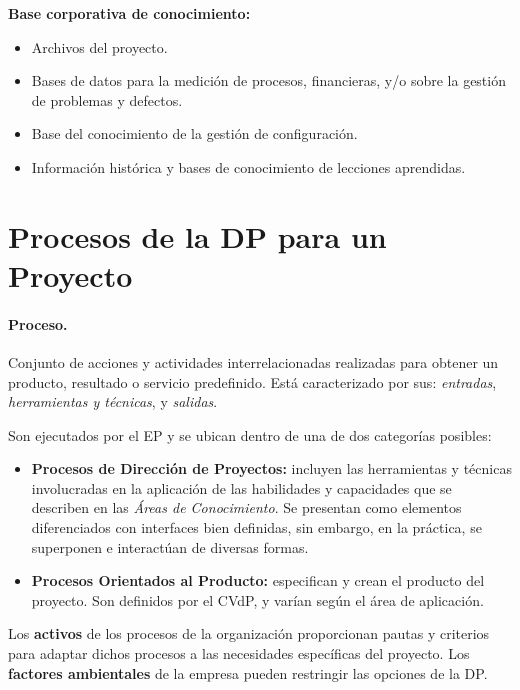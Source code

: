 \documentclass[10pt,a4paper]{article}
\begin{document}
\textbf{Base corporativa de conocimiento:}
\begin{itemize}
\item Archivos del proyecto.
\item Bases de datos para la medición de procesos, financieras, y/o sobre la gestión de problemas y defectos.
\item Base del conocimiento de la gestión de configuración.
\item Información histórica y bases de conocimiento de lecciones aprendidas.
\end{itemize}

\section{Procesos de la DP para un Proyecto}
\paragraph{Proceso.} Conjunto de acciones y actividades interrelacionadas realizadas para obtener un producto, resultado o servicio predefinido. Está caracterizado por sus: \textit{entradas}, \textit{herramientas y técnicas}, y \textit{salidas}.

Son ejecutados por el EP y se ubican dentro de una de dos categorías posibles:
\begin{itemize}
\item \textbf{Procesos de Dirección de Proyectos:} incluyen las herramientas y técnicas involucradas en la aplicación de las habilidades y capacidades que se describen en las \textit{Áreas de Conocimiento}. Se presentan como elementos
diferenciados con interfaces bien definidas, sin embargo, en la práctica, se superponen e interactúan de diversas formas.
\item \textbf{Procesos Orientados al Producto:} especifican y crean el producto del proyecto. Son definidos por el CVdP, y varían según el área de aplicación.
\end{itemize}

Los \textbf{activos} de los procesos de la organización proporcionan pautas y criterios para adaptar dichos procesos a las necesidades específicas del proyecto. Los \textbf{factores ambientales} de la empresa pueden restringir las opciones de la DP.
\end{document}
